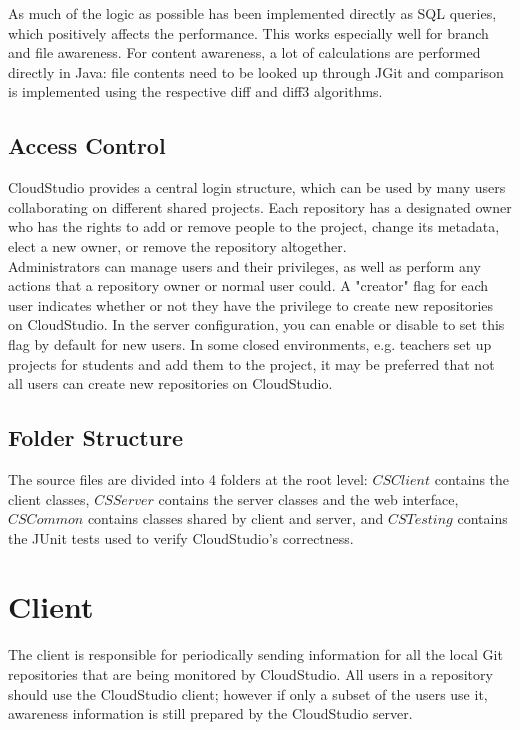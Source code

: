 As much of the logic as possible has been implemented directly as SQL queries, which positively affects the performance. This works especially well for branch and file awareness. For content awareness, a lot of calculations are performed directly in Java: file contents need to be looked up through JGit and comparison is implemented using the respective diff and diff3 algorithms.

\subsection{Access Control}

CloudStudio provides a central login structure, which can be used by many users collaborating on different shared projects. Each repository has a designated owner who has the rights to add or remove people to the project, change its metadata, elect a new owner, or remove the repository altogether. \\

Administrators can manage users and their privileges, as well as perform any actions that a repository owner or normal user could. A "creator" flag for each user indicates whether or not they have the privilege to create new repositories on CloudStudio. In the server configuration, you can enable or disable to set this flag by default for new users. In some closed environments, e.g. teachers set up projects for students and add them to the project, it may be preferred that not all users can create new repositories on CloudStudio.


\subsection{Folder Structure}

The source files are divided into 4 folders at the root level: $CSClient$ contains the client classes, $CSServer$ contains the server classes and the web interface, $CSCommon$ contains classes shared by client and server, and $CSTesting$ contains the JUnit tests used to verify CloudStudio's correctness.






\section{Client}

The client is responsible for periodically sending information for all the local Git repositories that are being monitored by CloudStudio. All users in a repository should use the CloudStudio client; however if only a subset of the users use it, awareness information is still prepared by the CloudStudio server. \\

